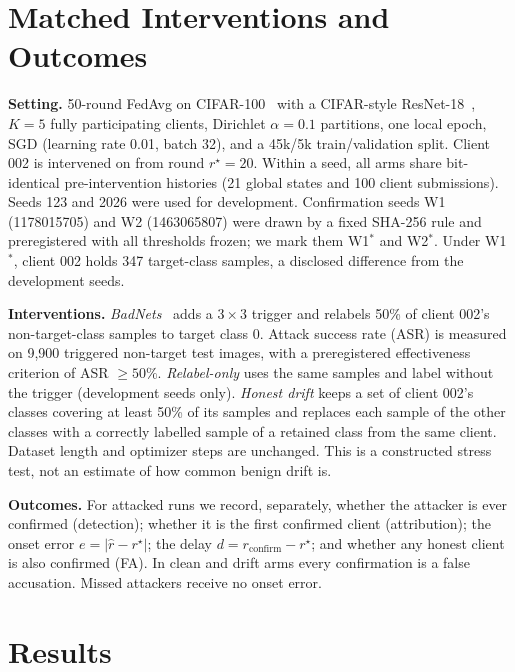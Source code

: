 \documentclass{article}
\newcommand{\Wone}{W1$^\ast$}
\newcommand{\Wtwo}{W2$^\ast$}
\begin{document}
\section{Matched Interventions and Outcomes}
\label{sec:protocol}

\textbf{Setting.} 50-round FedAvg on CIFAR-100~\cite{krizhevsky2009cifar} with a CIFAR-style
ResNet-18~\cite{he2016resnet}, $K=5$ fully participating clients, Dirichlet $\alpha=0.1$ partitions, one local
epoch, SGD (learning rate 0.01, batch 32), and a 45k/5k train/validation split. Client 002 is intervened on from
round $r^\star=20$. Within a seed, all arms share bit-identical pre-intervention histories (21 global states and 100
client submissions). Seeds 123 and 2026 were used for development. Confirmation seeds W1 (1178015705) and W2
(1463065807) were drawn by a fixed SHA-256 rule and preregistered with all thresholds frozen; we mark them
\Wone{} and \Wtwo. Under \Wone, client 002 holds 347 target-class samples, a disclosed difference from the
development seeds.

\textbf{Interventions.} \emph{BadNets}~\cite{gu2019badnets} adds a $3\times3$ trigger and relabels 50\% of client
002's non-target-class samples to target class 0. Attack success rate (ASR) is measured on 9,900 triggered
non-target test images, with a preregistered effectiveness criterion of ASR $\ge 50\%$. \emph{Relabel-only} uses
the same samples and label without the trigger (development seeds only). \emph{Honest drift} keeps a set of client
002's classes covering at least 50\% of its samples and replaces each sample of the other classes with a correctly
labelled sample of a retained class from the same client. Dataset length and optimizer steps are unchanged. This
is a constructed stress test, not an estimate of how common benign drift is.

\textbf{Outcomes.} For attacked runs we record, separately, whether the attacker is ever confirmed (detection);
whether it is the first confirmed client (attribution); the onset error $e=|\hat r-r^\star|$; the delay
$d=r_{\mathrm{confirm}}-r^\star$; and whether any honest client is also confirmed (FA). In clean and drift arms
every confirmation is a false accusation. Missed attackers receive no onset error.

\section{Results}
\label{sec:results}
\end{document}
